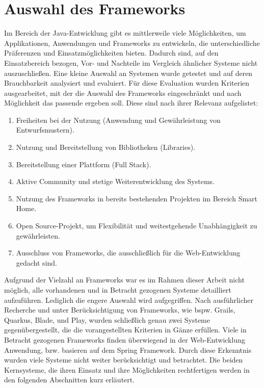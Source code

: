 \section{Auswahl des Frameworks}
\label{sec:frameworkauswahl}
    Im Bereich der Java-Entwicklung gibt es mittlerweile viele Möglichkeiten, um Applikationen, Anwendungen und Frameworks 
    zu entwickeln, die unterschiedliche Präferenzen und Einsatzmöglichkeiten bieten. Dadurch sind, auf den Einsatzbereich bezogen, 
    Vor- und Nachteile im Vergleich ähnlicher Systeme nicht auszuschließen. Eine kleine Auswahl an Systemen wurde getestet und auf deren 
    Brauchbarkeit analysiert und evaluiert. Für diese Evaluation wurden Kriterien ausgearbeitet, mit der die Auswahl des Frameworks 
    eingeschränkt und nach Möglichkeit das passende ergeben soll. Diese sind nach ihrer Relevanz aufgelistet: 
    \begin{enumerate}
        \item Freiheiten bei der Nutzung (Anwendung und Gewährleistung von Entwurfsmustern).
        \item Nutzung und Bereitstellung von Bibliotheken (Libraries).
        \item Bereitstellung einer Plattform (Full Stack).
        \item Aktive Community und stetige Weiterentwicklung des Systems.
        \item Nutzung des Frameworks in bereits bestehenden Projekten im Bereich Smart Home.
        \item Open Source-Projekt, um Flexibilität und weitestgehende Unabhängigkeit zu gewährleisten.
        \item Ausschluss von Frameworks, die ausschließlich für die Web-Entwicklung gedacht sind.
    \end{enumerate}  
    Aufgrund der Vielzahl an Frameworks war es im Rahmen dieser Arbeit nicht möglich, alle vorhandenen und in Betracht 
    gezogenen Systeme detailliert aufzuführen. Lediglich die engere Auswahl wird aufgegriffen. 
    Nach ausführlicher Recherche und unter Berücksichtigung von Frameworks, wie bspw. Grails, Quarkus, Blade, und Play, wurden 
    schließlich genau zwei Systeme gegenübergestellt, die die vorangestellten Kriterien in Gänze erfüllen. Viele in Betracht gezogenen Frameworks 
    finden überwiegend in der Web-Entwicklung Anwendung, bzw. basieren auf dem Spring Framework. Durch diese Erkenntnis wurden 
    viele Systeme nicht weiter berücksichtigt und betrachtet. Die beiden Kernsysteme, die ihren Einsatz und ihre Möglichkeiten rechtfertigen
    werden in den folgenden Abschnitten kurz erläutert.

